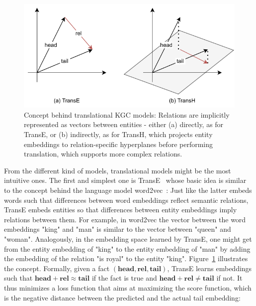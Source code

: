 \begin{figure}[t]
    \centering
    \includegraphics{3_related_work/2_embedding_based/translational}
    \caption{Concept behind translational KGC models: Relations are implicitly represented as vectors between entities - either (a) directly, as for TransE, or (b) indirectly, as for TransH, which projects entity embeddings to relation-specific hyperplanes before performing translation, which supports more complex relations.}
    \label{fig:3_related_work/2_embedding_based/translational}
\end{figure}

From the different kind of models, translational models might be the most intuitive ones. The first and simplest one is TransE~\cite{Bordes2013TranslatingEF} whose basic idea is similar to the concept behind the language model word2vec~\cite{Mikolov2013EfficientEO}: Just like the latter embeds words such that differences between word embeddings reflect semantic relations, TransE embeds entities so that differences between entity embeddings imply relations between them. For example, in word2vec the vector between the word embeddings "king" and "man" is similar to the vector between "queen" and "woman". Analogously, in the embedding space learned by TransE, one might get from the entity embedding of "king" to the entity embedding of "man" by adding the embedding of the relation "is royal" to the entity "king". Figure~\ref{fig:3_related_work/2_embedding_based/translational} illustrates the concept. Formally, given a fact $(\textbf{head}, \textbf{rel}, \textbf{tail})$, TransE learns embeddings such that $\textbf{head} + \textbf{rel} \approx \textbf{tail}$ if the fact is true and $\textbf{head} + \textbf{rel} \neq \textbf{tail}$ if not. It thus minimizes a loss function that aims at maximizing the score function, which is the negative distance between the predicted and the actual tail embedding:

